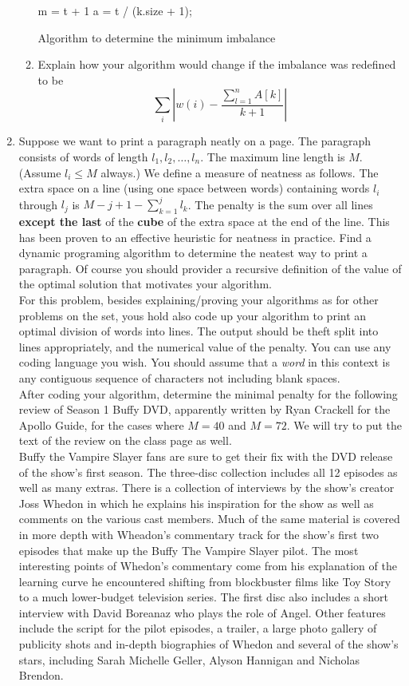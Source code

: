 \documentclass[tikz, 12pt]{scrartcl}
\begin{document}
\begin{enumerate}
\begin{enumerate}
\begin{algorithm}[th!]
{	}
	m = t + 1 
	a = t / (k.size + 1);
\caption{Algorithm to determine the minimum imbalance}
\label{minimumImbalance}
\end{algorithm}

		\item Explain how your algorithm would change if the imbalance was redefined to be
			$$
	\sum_{i} \left| w(i) - \frac{\sum_{l = 1}^n A[k]}{k + 1} \right|
	$$
	\end{enumerate}
	\item Suppose we want to print a paragraph neatly on a page. The paragraph consists of words of length $l_1, l_2, \ldots, l_n$. The maximum line length is $M$. (Assume $l_i \leq M$ always.) We define a measure of neatness as follows. The extra space on a line (using one space between words) containing words $l_i$ through $l_j$ is $M - j + 1 - \sum_{k =1}^{j} l_k$. The penalty is the sum over all lines \textbf{except the last} of the \textbf{cube} of the extra space at the end of the line. This has been proven to an effective heuristic for neatness in practice. Find a dynamic programing algorithm to determine the neatest way to print a paragraph. Of course you should provider a recursive definition of the value of the optimal solution that motivates your algorithm.\\
	For this problem, besides explaining/proving your algorithms as for other problems on the set, yous hold also code up your algorithm to print an optimal division of words into lines. The output should be theft split into lines appropriately, and the numerical value of the penalty. You can use any coding language you wish. You should assume that a \textit{word} in this context is any contiguous sequence of characters not including blank spaces.\\
	After coding your algorithm, determine the minimal penalty for the following review of Season 1 Buffy DVD, apparently written by Ryan Crackell for the Apollo Guide, for the cases where $M = 40$ and $M = 72$. We will try to put the text of the review on the class page as well.\\
	Buffy the Vampire Slayer fans are sure to get their fix with the DVD release of the show's first season. The three-disc collection includes all 12 episodes as well as many extras. There is a collection of interviews by the show's creator Joss Whedon in which he explains his inspiration for the show as well as comments on the various cast members. Much of the same material is covered in more depth with Wheadon's commentary track for the show's first two episodes that make up the Buffy The Vampire Slayer pilot. The most interesting points of Whedon's commentary come from his explanation of the learning curve he encountered shifting from blockbuster films like Toy Story to a much lower-budget television series. The first disc also includes a short interview with David Boreanaz who plays the role of Angel. Other features include the script for the pilot episodes, a trailer, a large photo gallery of publicity shots and in-depth biographies of Whedon and several of the show's stars, including Sarah Michelle Geller, Alyson Hannigan and Nicholas Brendon.
\end{enumerate}
\end{document}
